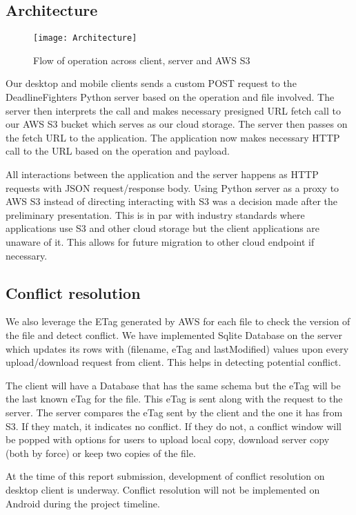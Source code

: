 \subsection{Architecture}

\begin{figure}[h!]
\centering
\texttt{[image: Architecture]}
\caption{Flow of operation across client, server and AWS S3}
\end{figure}

Our desktop and mobile clients sends a custom POST request to the DeadlineFighters Python server based on the operation and file involved. The server then interprets the call and makes necessary presigned URL fetch call to our AWS S3 bucket which serves as our cloud storage. The server then passes on the fetch URL to the application. The application now makes necessary HTTP call to the URL based on the operation and payload.\newline

All interactions between the application and the server happens as HTTP requests with JSON request/response body. Using Python server as a proxy to AWS S3 instead of directing interacting with S3 was a decision made after the preliminary presentation. This is in par with industry standards where applications use S3 and other cloud storage but the client applications are unaware of it. This allows for future migration to other cloud endpoint if necessary.\newline

\subsection{Conflict resolution}
We also leverage the ETag generated by AWS for each file to check the version of the file and detect conflict. We have implemented Sqlite Database on the server which updates its rows with (filename, eTag and lastModified) values upon every upload/download request from client. This helps in detecting potential conflict.\newline

The client will have a Database that has the same schema but the eTag will be the last known eTag for the file. This eTag is sent along with the request to the server. The server compares the eTag sent by the client and the one it has from S3. If they match, it indicates no conflict. If they do not, a conflict window will be popped with options for users to upload local copy, download server copy (both by force) or keep two copies of the file.\newline

At the time of this report submission, development of conflict resolution on desktop client is underway. Conflict resolution will not be implemented on Android during the project timeline.\newline